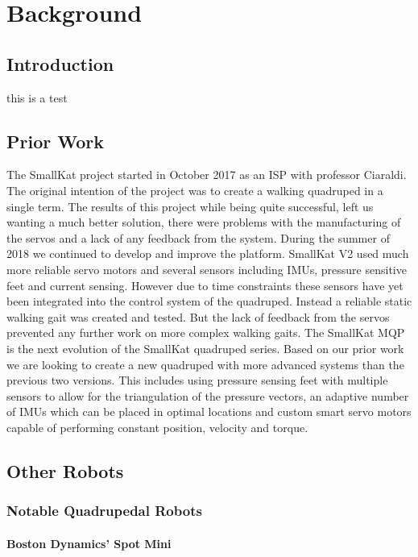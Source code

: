 \section{Background}
\label{chap:background}
\subsection{Introduction}
    this is a test
\subsection{Prior Work}
 The SmallKat project started in October 2017 as an ISP with professor Ciaraldi. The original intention of the project was to create a walking quadruped in a single term. The results of this project while being quite successful, left us wanting a much better solution, there were problems with the manufacturing of the servos and a lack of any feedback from the system. During the summer of 2018 we continued to develop and improve the platform. SmallKat V2 used much more reliable servo motors and several sensors including IMUs, pressure sensitive feet and current sensing. However due to time constraints these sensors have yet been integrated into the control system of the quadruped. Instead a reliable static walking gait was created and tested. But the lack of feedback from the servos prevented any further work on more complex walking gaits. The SmallKat MQP is the next evolution of the SmallKat quadruped series. Based on our prior work we are looking to create a new quadruped with more advanced systems than the previous two versions. This includes using pressure sensing feet with multiple sensors to allow for the triangulation of the pressure vectors, an adaptive number of IMUs which can be placed in optimal locations and custom smart servo motors capable of performing constant position, velocity and torque.

\subsection{Other Robots}
\subsubsection{Notable Quadrupedal Robots}
    \paragraph{Boston Dynamics’ Spot Mini}
    
